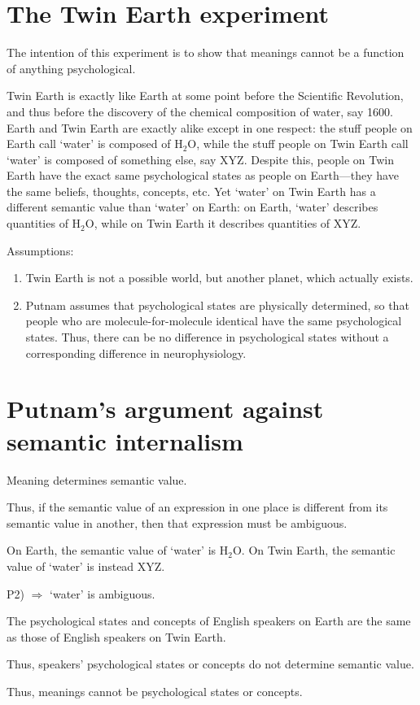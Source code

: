 \section{The Twin Earth experiment}

The intention of this experiment is to show that meanings cannot be a function of anything psychological.

\begin{example}
Twin Earth is exactly like Earth at some point before the Scientific Revolution, and thus before the discovery of the chemical composition of water, say 1600. Earth and Twin Earth are exactly alike except in one respect: the stuff people on Earth call `water' is composed of H$_2$O, while the stuff people on Twin Earth call `water' is composed of something else, say XYZ. Despite this, people on Twin Earth have the exact same psychological states as people on Earth---they have the same beliefs, thoughts, concepts, etc. Yet `water' on Twin Earth has a different semantic value than `water' on Earth: on Earth, `water' describes quantities of H$_2$O, while on Twin Earth it describes quantities of XYZ.
\end{example}

Assumptions:
\begin{enumerate}
  \item Twin Earth is not a possible world, but another planet, which actually exists.
  \item Putnam assumes that psychological states are physically determined, so that people who are molecule-for-molecule identical have the same psychological states. Thus, there can be no difference in psychological states without a corresponding difference in neurophysiology.
\end{enumerate}

\section{Putnam's argument against semantic internalism}

\begin{argument}[Putnam]\leavevmode
\begin{premises}
  \item[P1)] Meaning determines semantic value.
  \item[C1)] Thus, if the semantic value of an expression in one place is different from its semantic value in another, then that expression must be ambiguous.
  \item[P2)] On Earth, the semantic value of `water' is H$_2$O. On Twin Earth, the semantic value of `water' is instead XYZ.
  \item[C2)] P2) $\Rightarrow$ `water' is ambiguous.
  \item[P3)] The psychological states and concepts of English speakers on Earth are the same as those of English speakers on Twin Earth.
  \item[C3)] Thus, speakers' psychological states or concepts do not determine semantic value.
  \item[C4)] Thus, meanings cannot be psychological states or concepts.
\end{premises}
\end{argument}

